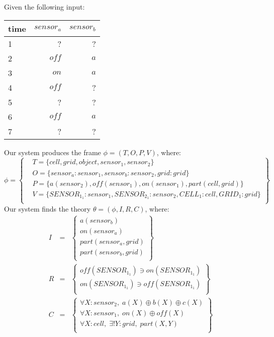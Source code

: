 
Given the following input:
\begin{table}[ht!]
\begin{center}
\begin{tabular}{|l|r|r|}
\hline
time & $\mathit{sensor}_a$& $\mathit{sensor}_b$\\
\hline
1 & ?& ? \\
2 & $\mathit{off}$& $\mathit{a}$ \\
3 & $\mathit{on}$& $\mathit{a}$ \\
4 & $\mathit{off}$& ? \\
5 & ?& ? \\
6 & $\mathit{off}$& $\mathit{a}$ \\
7 & ?& ? \\
\hline
\end{tabular}
\end{center}
\end{table}

Our system produces the frame $\phi = (T, O, P, V)$, where:
\begin{equation*}
\phi = \left \{
\begin{aligned}
& T = \{ 
cell,grid,object,sensor_1,sensor_2
\}\\
& O = \{
\mathit{sensor}_a: sensor_1,\mathit{sensor}_b: sensor_2,\mathit{grid}: grid
\}\\
& P = \{
\mathit{a}(sensor_2),\mathit{off}(sensor_1),\mathit{on}(sensor_1),\mathit{part}(cell, grid)
\}\\
& V = \{
SENSOR_1_1: sensor_1,SENSOR_2_1: sensor_2,CELL_1: cell,GRID_1: grid
\}\\
\end{aligned}\right\}
\end{equation*}
Our system finds the theory $\theta = (\phi, I, R, C)$, where:
\begin{eqnarray*}
I & = & \left\{ \begin{array}{l}
\mathit{a}(\mathit{sensor}_b)\\
\mathit{on}(\mathit{sensor}_a)\\
\mathit{part}(\mathit{sensor}_a,\mathit{grid})\\
\mathit{part}(\mathit{sensor}_b,\mathit{grid})\\
\end{array}\right\}\\
R & = &  \left\{ \begin{array}{l}
\mathit{off}(\mathit{SENSOR}_1_1) \ni \mathit{on}(\mathit{SENSOR}_1_1)\\
\mathit{on}(\mathit{SENSOR}_1_1) \ni \mathit{off}(\mathit{SENSOR}_1_1)\\
\end{array}\right\}\\
C & = & \left\{ \begin{array}{l}
\forall X : sensor_2,\;\mathit{a}(X) \oplus \mathit{b}(X) \oplus \mathit{c}(X)\\
\forall X : sensor_1,\;\mathit{on}(X) \oplus \mathit{off}(X)\\
\forall X : cell, \; \exists ! Y : grid, \; part(X, Y) \\
\end{array}\right\}\\
\end{eqnarray*}

